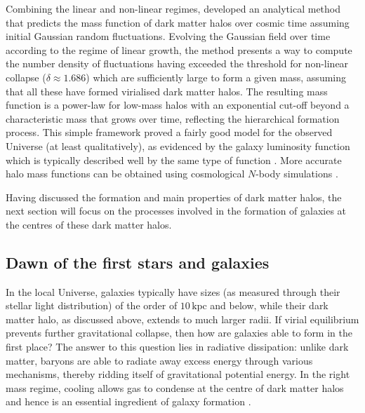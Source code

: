 Combining the linear and non-linear regimes, \citet{1974ApJ...187..425P} developed an analytical method that predicts the mass function of dark matter halos over cosmic time assuming initial Gaussian random fluctuations. Evolving the Gaussian field over time according to the regime of linear growth, the method presents a way to compute the number density of fluctuations having exceeded the threshold for non-linear collapse ($\delta \approx 1.686$) which are sufficiently large to form a given mass, assuming that all these have formed virialised dark matter halos. The resulting mass function is a power-law for low-mass halos with an exponential cut-off beyond a characteristic mass that grows over time, reflecting the hierarchical formation process. This simple framework proved a fairly good model for the observed Universe (at least qualitatively), as evidenced by the galaxy luminosity function which is typically described well by the same type of function \citep[][]{1976ApJ...203..297S}. More accurate halo mass functions can be obtained using cosmological $N$-body simulations \citep[e.g.][]{2008ApJ...688..709T}.

Having discussed the formation and main properties of dark matter halos, the next section will focus on the processes involved in the formation of galaxies at the centres of these dark matter halos.

\subsection{Dawn of the first stars and galaxies}
\label{chIssec:Galaxy_formation}

In the local Universe, galaxies typically have sizes (as measured through their stellar light distribution) of the order of $10 \, \mathrm{kpc}$ and below, while their dark matter halo, as discussed above, extends to much larger radii. If virial equilibrium prevents further gravitational collapse, then how are galaxies able to form in the first place? The answer to this question lies in radiative dissipation: unlike dark matter, baryons are able to radiate away excess energy through various mechanisms, thereby ridding itself of gravitational potential energy. In the right mass regime, cooling allows gas to condense at the centre of dark matter halos and hence is an essential ingredient of galaxy formation \citep{1977ApJ...211..638S, 1977MNRAS.179..541R, 1977ApJ...215..483B, 1978MNRAS.183..341W}.

